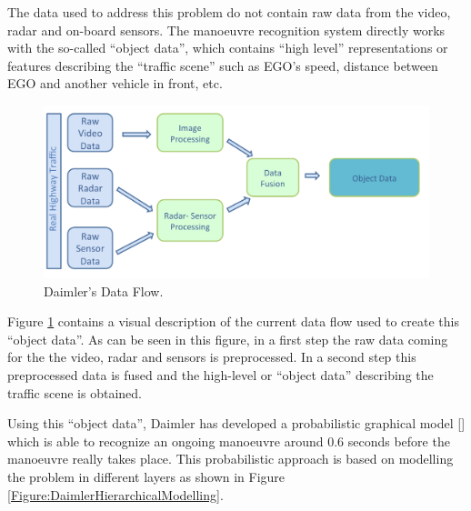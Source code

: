 The data used to address this problem do not contain raw data from the video, radar and on-board sensors. The manoeuvre recognition system directly works with the so-called ``object data'', which contains ``high level'' representations or features describing the ``traffic scene'' such as EGO's speed, distance between EGO and another vehicle in front, etc.  
\begin{figure}
\begin{center}
\includegraphics[scale=0.35]{./figures/DaimlerDataFlow}
\caption{\label{Figure:DaimlerDataFlow} Daimler's Data Flow.}
\end{center}
\end{figure}

Figure \ref{Figure:DaimlerDataFlow} contains a visual description of the current data flow used to create this ``object data''.  As can be seen in this figure, in a first step the raw data coming for the the video, radar and sensors is preprocessed. In a second step this preprocessed data is fused and the high-level or ``object data'' describing the traffic scene is obtained. 

Using this ``object data'', Daimler has developed a probabilistic graphical model [] which is able to recognize an ongoing manoeuvre around 0.6 seconds before the manoeuvre really takes place. This probabilistic approach is based on modelling the problem in different layers as shown in Figure \ref{Figure:DaimlerHierarchicalModelling}.



